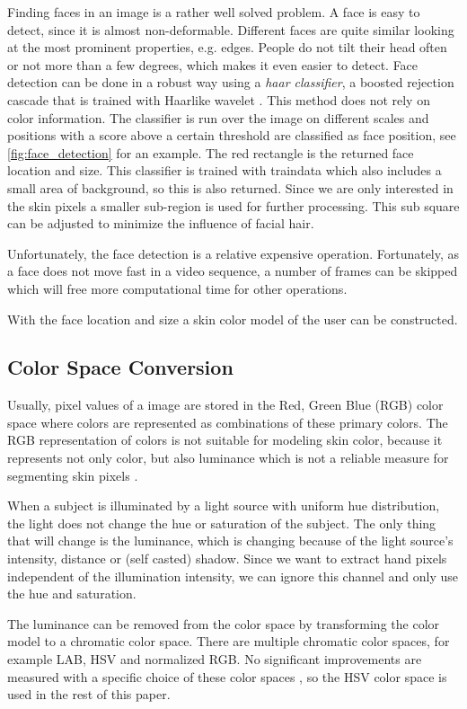 Finding faces in an image is a rather well solved problem. A face is easy to detect, since it is almost non-deformable. Different faces are quite similar looking at the most prominent properties, e.g. edges. People do not tilt their head often or not more than a few degrees, which makes it even easier to detect. Face detection can be done in a robust way using a \emph{haar classifier}, a boosted rejection cascade that is trained with Haar\-like wavelet \citep{Viola2001,Viola2004}. This  method does not rely on color information. The classifier is run over the image on different scales and positions with a score above a certain threshold are classified as face position, see \autoref{fig:face_detection} for an example. The red rectangle is the returned face location and size. This classifier is trained with traindata which also includes a small area of background, so this is also returned. Since we are only interested in the skin pixels a smaller sub-region is used for further processing. This sub square can be adjusted to minimize the influence of facial hair. 

Unfortunately, the face detection is a relative expensive operation. Fortunately, as a face does not move fast in a video sequence, a number of frames can be skipped which will free more computational time for other operations.

With the face location and size a skin color model of the user can be constructed.

\subsection*{Color Space Conversion}
Usually, pixel values of a image are stored in the Red, Green Blue (RGB) color space where colors are represented as combinations of these primary colors. The RGB representation of colors is not suitable for modeling skin color, because it represents not only color, but also luminance which is not a reliable measure for segmenting skin pixels \citep{Cai1999}.

When a subject is illuminated by a light source with uniform hue distribution, the light does not change the hue or saturation of the subject. The only thing that will change is the luminance, which is changing because of the light source's intensity, distance or (self casted) shadow. Since we want to extract hand pixels independent of the illumination intensity, we can ignore this channel and only use the hue and saturation.

The luminance can be removed from the color space by transforming the color model to a chromatic color space. There are multiple chromatic color spaces, for example LAB, HSV and normalized RGB. No significant improvements are measured with a specific choice of these color spaces \citep{vsa03survey, Bradski1998}, so the HSV color space is used in the rest of this paper.

